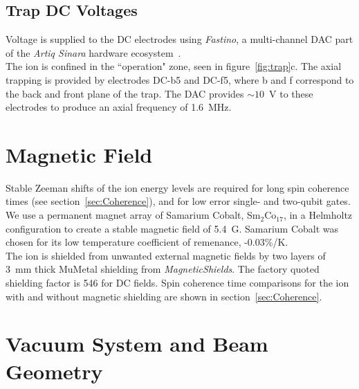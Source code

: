 \subsection{Trap DC Voltages}
    Voltage is supplied to the DC electrodes using \emph{Fastino}, a
    multi-channel DAC part of the \emph{Artiq Sinara} hardware
    ecosystem~\cite{}.\\
    The ion is confined in the ``operation" zone, seen in
    figure~\ref{fig:trap}c. The axial trapping is provided by electrodes
    DC-b5 and DC-f5, where b and f correspond to the back and front plane of the trap. 
    The DAC provides $\sim 10$~V to these electrodes to produce an axial frequency of 1.6~MHz.
    
\section{Magnetic Field}
\label{sec:Magnetic Field}
    Stable Zeeman shifts of the ion energy levels are required for long spin
    coherence times (see section~\ref{sec:Coherence}), and for low error single-
    and two-qubit gates. We use a permanent magnet array of Samarium Cobalt,
    Sm$_2$Co$_17$, in a Helmholtz configuration to create a stable magnetic
    field of 5.4~G. Samarium Cobalt was chosen for its low temperature
    coefficient of remenance, -0.03\%/K.\\
    The ion is shielded from unwanted external magnetic fields by two layers of
    3~mm thick MuMetal shielding from \emph{MagneticShields}. The factory quoted
    shielding factor is 546 for DC fields. Spin coherence time comparisons for
    the ion with and without magnetic shielding are shown in
    section~\ref{sec:Coherence}.\\

\section{Vacuum System and Beam Geometry}
\label{sec:Vacuum System}



